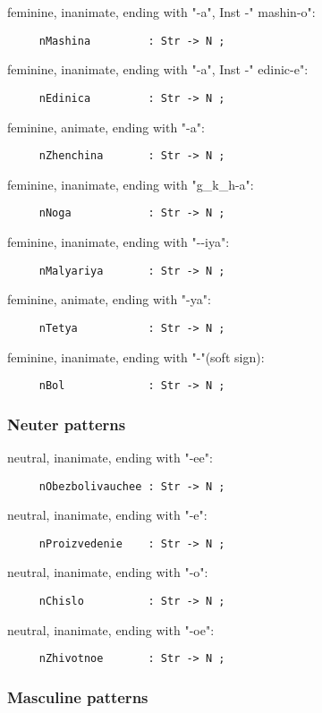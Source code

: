 \noindent feminine, inanimate, ending with "-a", Inst -"{\cyr
mashin-o\cyrishrt{}}":
\begin{verbatim}
     nMashina         : Str -> N ;
\end{verbatim}
feminine, inanimate, ending with "-a", Inst -"{\cyr
edinic-e\cyrishrt{}}":
\begin{verbatim}
     nEdinica         : Str -> N ;
\end{verbatim}
feminine, animate, ending with "-a":
\begin{verbatim}
     nZhenchina       : Str -> N ;
\end{verbatim}
feminine, inanimate, ending with "{\cyr g\_k\_h-a}":
\begin{verbatim}
     nNoga            : Str -> N ;
\end{verbatim}
feminine, inanimate, ending with "-{\cyr -iya}":
\begin{verbatim}
     nMalyariya       : Str -> N ;
\end{verbatim}
feminine, animate, ending with "{\cyr -ya}":
\begin{verbatim}
     nTetya           : Str -> N ;
\end{verbatim}
feminine, inanimate, ending with "-{\cyr \cyrsftsn{}}"(soft sign):
\begin{verbatim}
     nBol             : Str -> N ;
\end{verbatim}

\subsubsection{Neuter patterns}

\noindent neutral, inanimate, ending with "-ee":
\begin{verbatim}
     nObezbolivauchee : Str -> N ;
\end{verbatim}
neutral, inanimate, ending with "-e":
\begin{verbatim}
     nProizvedenie    : Str -> N ;
\end{verbatim}
neutral, inanimate, ending with "-o":
\begin{verbatim}
     nChislo          : Str -> N ;
\end{verbatim}
neutral, inanimate, ending with "-{\cyr oe}":
\begin{verbatim}
     nZhivotnoe       : Str -> N ;
\end{verbatim}

\subsubsection{Masculine patterns}

